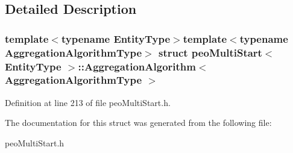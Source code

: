 \subsection{Detailed Description}
\subsubsection*{template$<$typename Entity\-Type$>$template$<$typename Aggregation\-Algorithm\-Type$>$ struct peo\-Multi\-Start$<$ Entity\-Type $>$::Aggregation\-Algorithm$<$ Aggregation\-Algorithm\-Type $>$}





Definition at line 213 of file peo\-Multi\-Start.h.

The documentation for this struct was generated from the following file:\begin{CompactItemize}
\item 
peo\-Multi\-Start.h\end{CompactItemize}
